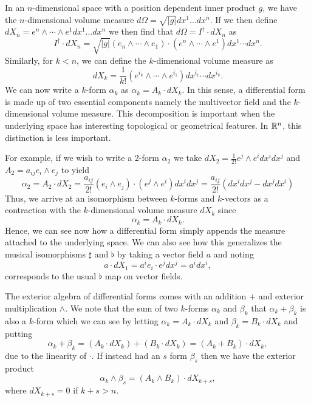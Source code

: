 In an $n$-dimensional space with a position dependent inner product $g$, we have the $n$-dimensional volume measure $d\Omega = \sqrt{|g|} dx^1\dots dx^n$. If we then define $dX_n = e^n \wedge \cdots \wedge e^1 dx^1 \dots dx^n$ we then find that $d\Omega = I^\dagger \cdot dX_n$ as
\[
I^\dagger \cdot dX_n = \sqrt{|g|} (e_n \wedge \cdots \wedge e_1) \cdot (e^n \wedge \cdots \wedge e^1) dx^1 \cdots dx^n.
\]
Similarly, for $k<n$, we can define the $k$-dimensional volume measure as 
\[
dX_k = \frac{1}{k!}(e^{i_k}\wedge \cdots \wedge e^{i_1}) dx^{i_1} \cdots dx^{i_k}.
\]
We can now write a $k$-form $\alpha_k$ as $\alpha_k = A_k \cdot dX_k$. In this sense, a differential form is made up of two essential components namely the multivector field and the $k$-dimensional volume measure.  This decomposition is important when the underlying space has interesting topological or geometrical features. In $\mathbb{R}^n$, this distinction is less important. 

For example, if we wish to write a 2-form $\alpha_2$ we take $dX_2 = \frac{1}{2!} e^j \wedge e^i dx^i dx^j$ and $A_2 = a_{ij} e_i \wedge e_j$ to yield
\[
\alpha_2 = A_2 \cdot dX_2 = \frac{a_{ij}}{2!} (e_i \wedge e_j) \cdot (e^j \wedge e^i) dx^i dx^j = \frac{a_{ij}}{2!} (dx^i dx^j - dx^j dx^i)
\]
Thus, we arrive at an isomorphism between $k$-forms and $k$-vectors as a contraction with the $k$-dimensional volume measure $dX_k$ since
\[
\alpha_k = A_k \cdot dX_k.
\]
Hence, we can see now how a differential form simply appends the measure attached to the underlying space. We can also see how this generalizes the musical isomorphisms $\sharp$ and $\flat$ by taking a vector field $a$ and noting
\begin{equation}
\label{eq:line_element}
a \cdot dX_1 = a^i e_i \cdot e^j dx^j = a^i dx^i,
\end{equation}
corresponds to the usual $\flat$ map on vector fields.

The exterior algebra of differential forms comes with an addition $+$ and exterior multiplication $\wedge$.  We note that the sum of two $k$-forms $\alpha_k$ and $\beta_k$ that $\alpha_k+\beta_k$ is also a $k$-form which we can see by letting $\alpha_k = A_k \cdot dX_k$ and $\beta_k = B_k \cdot dX_k$ and putting
\[
\alpha_k + \beta_k = (A_k \cdot dX_k)+(B_k \cdot dX_k) = (A_k + B_k) \cdot dX_k,
\]
due to the linearity of $\cdot$.  If instead had an $s$ form $\beta_s$ then we have the exterior product
\[
\alpha_k \wedge \beta_s = (A_k \wedge B_k) \cdot dX_{k+s},
\]
where $dX_{k+s}=0$ if $k+s>n$.  

